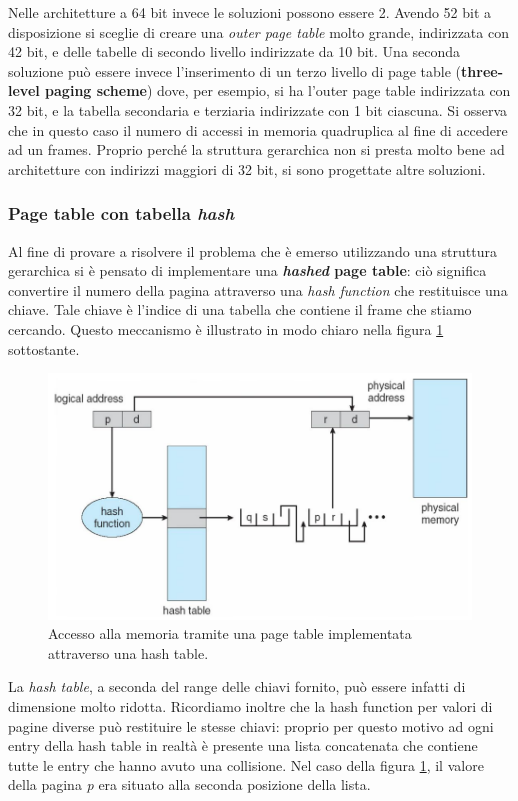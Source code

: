 Nelle architetture a 64 bit invece le soluzioni possono essere 2. Avendo 52 bit a disposizione si sceglie di creare una \textit{outer page table} molto grande, indirizzata con 42 bit, e delle tabelle di secondo livello indirizzate da 10 bit. Una seconda soluzione può essere invece l'inserimento di un terzo livello di page table (\textbf{three-level paging scheme}) dove, per esempio, si ha l'outer page table indirizzata con 32 bit, e la tabella secondaria e terziaria indirizzate con 1 bit ciascuna. Si osserva che in questo caso il numero di accessi in memoria quadruplica al fine di accedere ad un frames. Proprio perché la struttura gerarchica non si presta molto bene ad architetture con indirizzi maggiori di 32 bit, si sono progettate altre soluzioni.

% 
\subsubsection{Page table con tabella \textit{hash}}
Al fine di provare a risolvere il problema che è emerso utilizzando una struttura gerarchica si è pensato di implementare una \textbf{\textit{hashed} page table}: ciò significa convertire il numero della pagina attraverso una \textit{hash function} che restituisce una chiave. Tale chiave è l'indice di una tabella che contiene il frame che stiamo cercando. Questo meccanismo è illustrato in modo chiaro nella figura \ref{fig:hashed_page_table} sottostante. 
\begin{figure}[h]
    \centering
    \includegraphics[width = .7\textwidth]{../res/imgs/main memory/hashed_page_table.png}
    \caption{Accesso alla memoria tramite una page table implementata attraverso una hash table.}
    \label{fig:hashed_page_table}
\end{figure}
La \textit{hash table}, a seconda del range delle chiavi fornito, può essere infatti di dimensione molto ridotta. Ricordiamo inoltre che la hash function per valori di pagine diverse può restituire le stesse chiavi: proprio per questo motivo ad ogni entry della hash table in realtà è presente una lista concatenata che contiene tutte le entry che hanno avuto una collisione. Nel caso della figura \ref{fig:hashed_page_table}, il valore della pagina \textit{p} era situato alla seconda posizione della lista. 

